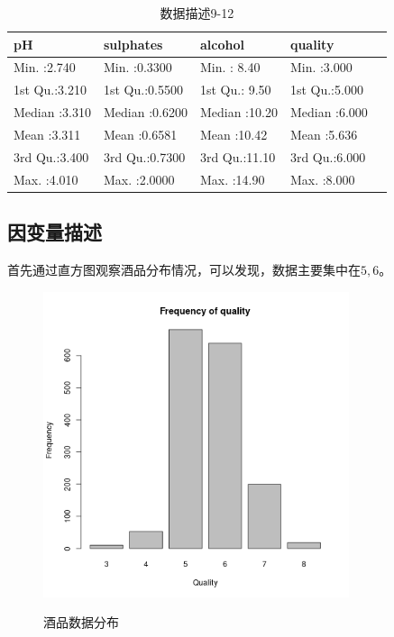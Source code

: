 \documentclass[fontset=ubuntu]{ctexart}
\begin{document}
        \begin{table}[ht]
            \centering
            \caption{数据描述9-12}
            \vspace{5pt}
            \begin{tabular}{lllll}
                \hline
                pH &   sulphates &    alcohol &    quality \\ 
                \hline
                Min.   :2.740   & Min.   :0.3300   & Min.   : 8.40   & Min.   :3.000   \\ 
                1st Qu.:3.210   & 1st Qu.:0.5500   & 1st Qu.: 9.50   & 1st Qu.:5.000   \\ 
                Median :3.310   & Median :0.6200   & Median :10.20   & Median :6.000   \\ 
                Mean   :3.311   & Mean   :0.6581   & Mean   :10.42   & Mean   :5.636   \\ 
                3rd Qu.:3.400   & 3rd Qu.:0.7300   & 3rd Qu.:11.10   & 3rd Qu.:6.000   \\ 
                Max.   :4.010   & Max.   :2.0000   & Max.   :14.90   & Max.   :8.000   \\ 
                \hline
            \end{tabular}
            \label{tab:description9-12}
            \end{table}
        
        \clearpage
        \subsection{因变量描述}
            首先通过直方图观察酒品分布情况，可以发现，数据主要集中在$5, 6$。 
            \begin{figure}[htbp]
                \centering
                \includegraphics[width=0.8\textwidth]{../figures/quality-frequency.png}
                \label{fig:quality}
                \caption{酒品数据分布}
            \end{figure}
\end{document}
